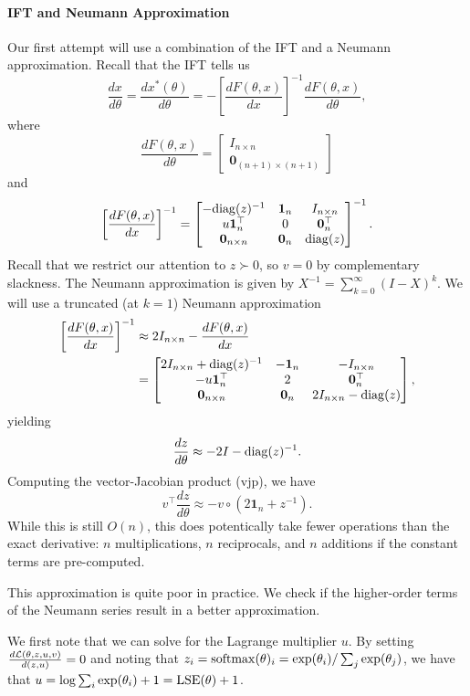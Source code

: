 \documentclass[11pt]{article}
\begin{document}
\paragraph{IFT and Neumann Approximation}
Our first attempt will use a combination of the IFT and a Neumann approximation.
Recall that the IFT tells us
$$\frac{dx}{d\theta} = \frac{dx^*(\theta)}{d\theta}
= -\left[\frac{dF(\theta,x)}{dx}\right]^{-1}\frac{dF(\theta,x)}{d\theta},$$
where 
$$\frac{dF(\theta,x)}{d\theta} = \begin{bmatrix}
    I_{n\times n}\\
    \mathbf{0}_{(n+1)\times (n+1)}
\end{bmatrix}$$
and
$$
\left[\frac{dF(\theta,x)}{dx}\right]^{-1} = \begin{bmatrix}
-\mathrm{diag}(z)^{-1} & \mathbf{1}_n & I_{n\times n} \\
u\mathbf{1}_n^\top & 0 & \mathbf{0}_n^\top\\
\mathbf{0}_{n\times n} & \mathbf{0}_n & \mathrm{diag}(z)
\end{bmatrix}^{-1}.
$$
Recall that we restrict our attention to $z\succ 0$, so $v=0$ by complementary slackness. 
The Neumann approximation is given by $X^{-1} = \sum_{k=0}^\infty (I-X)^k$.
We will use a truncated (at $k=1$) Neumann approximation
\begin{align*}
    \left[\frac{dF(\theta,x)}{dx}\right]^{-1}
    &\approx 2I_{n \times n} - \frac{dF(\theta,x)}{dx}\\
    &= \begin{bmatrix}
    2I_{n\times n} + \mathrm{diag}(z)^{-1} & -\mathbf{1}_n & -I_{n\times n} \\
    -u\mathbf{1}_n^\top & 2 & \mathbf{0}^\top_n\\
    \mathbf{0}_{n\times n} & \mathbf{0}_n & 2I_{n\times n}-\mathrm{diag}(z)
    \end{bmatrix},
\end{align*}
yielding
$$\frac{dz}{d\theta}\approx -2I - \mathrm{diag}(z)^{-1}.$$
Computing the vector-Jacobian product (vjp), we have
$$v^\top \frac{dz}{d\theta} \approx -v \circ(2\mathbf{1}_n + z^{-1}).$$
While this is still $O(n)$, this does potentically take fewer operations than the exact derivative:
$n$ multiplications, $n$ reciprocals, and $n$ additions if the constant terms are pre-computed.

This approximation is quite poor in practice.
We check if the higher-order terms of the Neumann series result in a better approximation.

We first note that we can solve for the Lagrange multiplier $u$.
By setting $\frac{d\mathcal{L}(\theta,z,u,v)}{d(z,u)} = 0$ and noting that
$z_i = \mathrm{softmax}(\theta)_i = \exp(\theta_i) / \sum_j \exp(\theta_j)$,
we have that $u = \log\sum_i\exp(\theta_i) + 1 = \mathrm{LSE}(\theta) + 1$.
\end{document}
